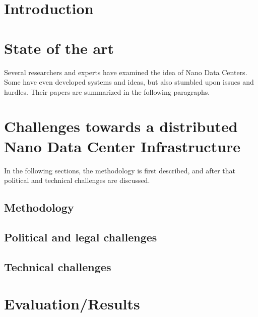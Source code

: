 
\section{Introduction}


\section{State of the art}
Several researchers and experts have examined the idea of Nano Data Centers. Some have even developed systems and ideas, but also stumbled upon issues and hurdles. Their papers are summarized in the following paragraphs. 



\section{Challenges towards a distributed Nano Data Center Infrastructure}
In the following sections, the methodology is first described, and after that political and technical challenges are discussed. 

\subsection{Methodology}



\subsection{Political and legal challenges}


\subsection{Technical challenges}


\section{Evaluation/Results}


